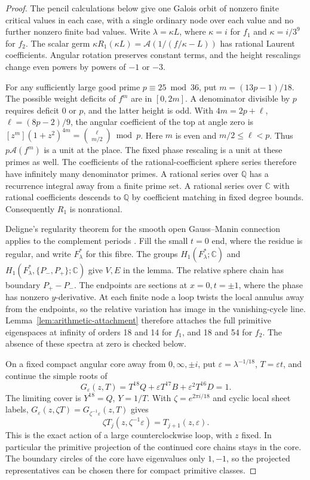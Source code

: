 \documentclass[11pt]{article}
\newcommand{\A}{\mathcal A}
\begin{document}
\begin{proof}
The pencil calculations below give one Galois orbit of
nonzero finite critical values in each case, with a single
ordinary node over each value and no further nonzero finite
bad values. Write \(\lambda=\kappa L\), where \(\kappa=i\) for
\(f_1\) and \(\kappa=i/3^9\) for \(f_2\). The scalar germ
\(\kappa R_1(\kappa L)=\A(1/(f/\kappa-L))\) has rational
Laurent coefficients. Angular rotation preserves constant
terms, and the height rescalings change even powers by
powers of \(-1\) or \(-3\).

For any sufficiently large good prime \(p\equiv25\bmod36\),
put \(m=(13p-1)/18\). The possible weight deficits of \(f^m\)
are in \([0,2m]\). A denominator divisible by \(p\) requires
deficit 0 or \(p\), and the latter height is odd.
With \(4m=2p+\ell\), \(\ell=(8p-2)/9\), the angular
coefficient of the top at angle zero is
\([z^m](1+z^2)^{4m}=\binom{\ell}{m/2}\bmod p\).
Here \(m\) is even and \(m/2\le\ell<p\). Thus
\(p\A(f^m)\) is a unit at the place. The fixed phase
rescaling is a unit at these primes as well. The
coefficients of the rational-coefficient sphere series
therefore have infinitely many denominator primes.
A rational series over \(\mathbb Q\) has a recurrence
integral away from a finite prime set. A rational
series over \(\mathbb C\) with rational coefficients
descends to \(\mathbb Q\) by coefficient matching in fixed
degree bounds. Consequently \(R_1\) is nonrational.

Deligne's regularity theorem for the smooth open
Gauss--Manin connection applies to the complement periods
\cite[Theorem~14.3]{katzregular}. Fill the small \(t=0\)
end, where the residue is regular, and write \(F_\lambda^*\)
for this fibre. The groups \(H_1(F_\lambda^*;\mathbb C)\)
and \(H_1(F_\lambda^*,\{P_-,P_+\};\mathbb C)\) give \(V,E\)
in the lemma. The relative sphere chain has boundary
\(P_+-P_-\). The endpoints are sections at \(x=0,t=\pm1\),
where the phase has nonzero \(y\)-derivative. At each finite
node a loop twists the local annulus away from the endpoints,
so the relative variation has image in the vanishing-cycle line. Lemma~\ref{lem:arithmetic-attachment} therefore
attaches the full primitive eigenspaces at infinity of
orders 18 and 14 for \(f_1\), and 18 and 54 for \(f_2\).
The absence of these spectra at zero is checked below.

On a fixed compact angular core away from \(0,\infty,\pm i\),
put \(\varepsilon=\lambda^{-1/18}\), \(T=\varepsilon t\),
and continue the simple roots of
\[
 G_\varepsilon(z,T)=T^{18}Q+\varepsilon T^{17}B+
                              \varepsilon^2T^{16}D=1.
\]
The limiting cover is \(Y^{18}=Q\), \(Y=1/T\).
With \(\zeta=e^{2\pi i/18}\) and cyclic local sheet labels,
\(G_\varepsilon(z,\zeta T)=G_{\zeta^{-1}\varepsilon}(z,T)\)
gives
\[
           \zeta T_j(z,\zeta^{-1}\varepsilon)=T_{j+1}(z,\varepsilon).
\]
This is the exact action of a large counterclockwise loop,
with \(z\) fixed. In particular the primitive projection
of the continued core chains stays in the core. The
boundary circles of the core have eigenvalues only
\(1,-1\), so the projected representatives can be chosen
there for compact primitive classes.


\end{proof}
\end{document}

